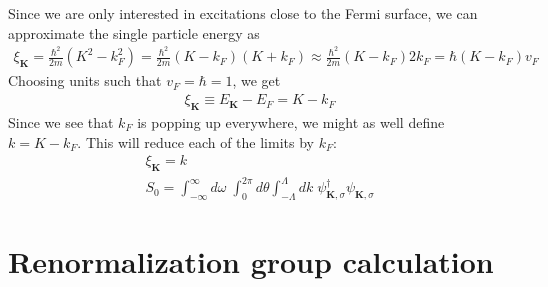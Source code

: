 \documentclass[14pt]{extarticle}
\begin{document}
\\\\
Since we are only interested in excitations close to the Fermi surface, we can approximate the single particle energy as
\begin{equation}\begin{aligned}
	\xi_\mathbf{K} = \frac{\hbar^2}{2m}\left(K^2 - k_F^2\right) = \frac{\hbar^2}{2m}\left(K - k_F\right)\left(K + k_F\right) \approx \frac{\hbar^2}{2m}\left(K - k_F\right)2k_F = \hbar \left(K-k_F\right)v_F
\end{aligned}\end{equation}
Choosing units such that \(v_F = \hbar = 1\), we get
\begin{equation}\begin{aligned}
	\xi_\mathbf{K} \equiv E_\mathbf{K} - E_F = K - k_F
\end{aligned}\end{equation}
Since we see that \(k_F\) is popping up everywhere, we might as well define \(k = K - k_F\). This will reduce each of the limits by \(k_F\):
\begin{gather}
	\xi_\mathbf{K} = k \\
	S_0 = \int_{-\infty}^\infty d\omega\;\int_0^{2\pi} d\theta \int_{- \Lambda}^{\Lambda}  dk\; \psi_{\mathbf{K},\sigma}^\dagger \psi_{\mathbf{K},\sigma}\label{action}
\end{gather}
\section{Renormalization group calculation}
\end{document}
